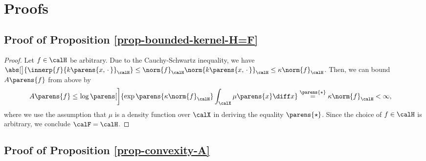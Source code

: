 \documentclass[12pt]{article}
\theoremstyle{definition}
\theoremstyle{theorem}
\theoremstyle{remark}
\begin{document}
\section{Proofs}\label{section-chapter2-proof}


\subsection{Proof of Proposition \ref{prop-bounded-kernel-H=F}}\label{subsection-proof-prop-bounded-kernel-H=F}

\begin{proof}
	Let $f \in \calH$ be arbitrary. Due to the Cauchy-Schwartz inequality, we have $\abs[\big]{\innerp{f}{k \parens{x, \,\cdot\,}}_{\calH}} \le \norm{f}_{\calH} \norm{k \parens{x, \,\cdot\,}}_{\calH} \le \kappa \norm{f}_{\calH}$. Then, we can bound $A \parens{f}$ from above by 
	\begin{align*}
		A \parens{f} \le & \, \log \parens[\bigg]{\exp \parens{\kappa \norm{f}_{\calH} } \int_{\calX} \mu \parens{x}  \diff x} \stackrel{\parens{\star}}{=} \kappa \norm{f}_{\calH} < \infty, 
	\end{align*}
	where we use the assumption that $\mu$ is a density function over $\calX$ in deriving the equality $\parens{\star}$. Since the choice of $f \in \calH$ is arbitrary, we conclude $\calF = \calH$. 
\end{proof}


\subsection{Proof of Proposition \ref{prop-convexity-A}}\label{subsection-prop-convexity-A}
\end{document}
